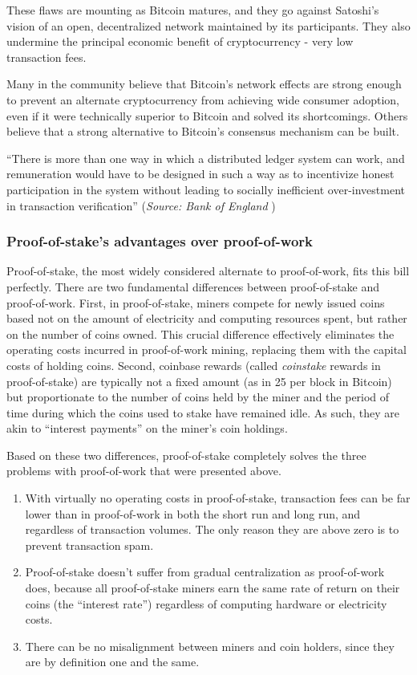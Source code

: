 \documentclass[a4paper,11pt]{article}
\begin{document}
These flaws are mounting as Bitcoin matures, and they go against Satoshi's vision of an open, decentralized network maintained by its participants. They also undermine the principal economic benefit of cryptocurrency - very low transaction fees. 


Many in the community believe that Bitcoin's network effects are strong enough to prevent an alternate cryptocurrency from achieving wide consumer adoption, even if it were technically superior to Bitcoin and solved its shortcomings. Others believe that a strong alternative to Bitcoin's consensus mechanism can be built. 

``There is more than one way in which a distributed ledger system can work, and remuneration would have to be designed in such a way as to incentivize honest participation in the system without leading to socially inefficient over-investment in transaction verification'' (\textit{Source: Bank of England} \cite[p31.]{bank})

\subsubsection*{Proof-of-stake's advantages over proof-of-work}

Proof-of-stake, the most widely considered alternate to proof-of-work, fits this bill perfectly. There are two fundamental differences between proof-of-stake and proof-of-work. 
First, in proof-of-stake, miners compete for newly issued coins based not on the amount of electricity and computing resources spent, but rather on the number of coins owned. This crucial difference effectively eliminates the operating costs incurred in proof-of-work mining, replacing them with the capital costs of holding coins.
Second, coinbase rewards (called \textit{\textit{coinstake}} rewards in proof-of-stake) are typically not a fixed amount (as in 25 per block in Bitcoin) but proportionate to the number of coins held by the miner and the period of time during which the coins used to stake have remained idle. As such, they are akin to ``interest payments'' on the miner's coin holdings.



Based on these two differences, proof-of-stake completely solves the three problems with proof-of-work that were presented above.
\begin{enumerate}
\setlength{\itemsep}{0pt}
\item{With virtually no operating costs in proof-of-stake, transaction fees can be far lower than in proof-of-work in both the short run and long run, and regardless of transaction volumes. The only reason they are above zero is to prevent transaction spam.}
\item{Proof-of-stake doesn't suffer from gradual centralization as proof-of-work does, because all proof-of-stake miners earn the same rate of return on their coins (the ``interest rate'') regardless of computing hardware or electricity costs.
}
\item{There can be no misalignment between miners and coin holders, since they are by definition one and the same.}
\end{enumerate}
\end{document}
